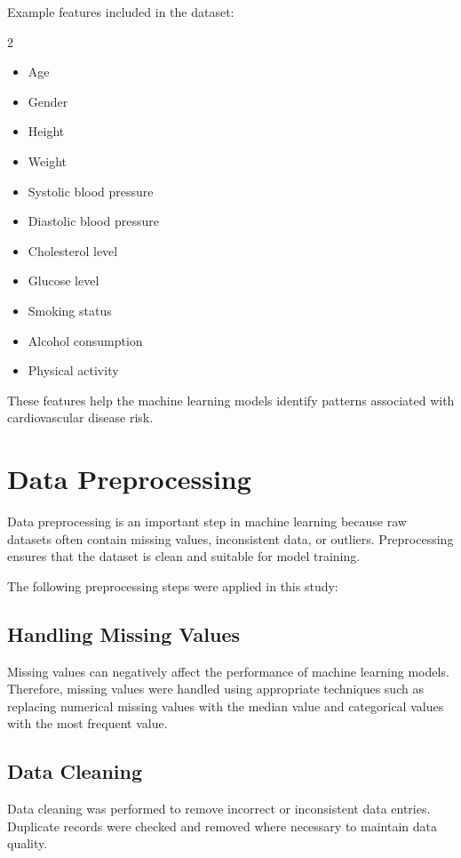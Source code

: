 Example features included in the dataset:

\begin{multicols}{2}
\begin{itemize}
\item Age
\item Gender
\item Height
\item Weight
\item Systolic blood pressure
\item Diastolic blood pressure
\item Cholesterol level
\item Glucose level
\item Smoking status
\item Alcohol consumption
\item Physical activity
\end{itemize}
\end{multicols}

These features help the machine learning models identify patterns associated with cardiovascular disease risk.

\section{Data Preprocessing}

Data preprocessing is an important step in machine learning because raw datasets often contain missing values, inconsistent data, or outliers. Preprocessing ensures that the dataset is clean and suitable for model training.

The following preprocessing steps were applied in this study:

\subsection{Handling Missing Values}

Missing values can negatively affect the performance of machine learning models. Therefore, missing values were handled using appropriate techniques such as replacing numerical missing values with the median value and categorical values with the most frequent value.

\subsection{Data Cleaning}

Data cleaning was performed to remove incorrect or inconsistent data entries. Duplicate records were checked and removed where necessary to maintain data quality.


